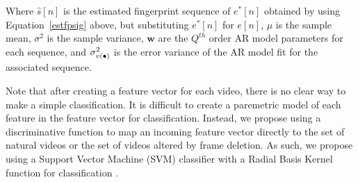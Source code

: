 Where $\hat{s}[n]$ is the estimated fingerprint sequence of $e^{*}[n]$ obtained by using Equation~\ref{estfpsig} above, but substituting $e^{*}[n]$ for $e[n]$, $\mu$ is the sample mean, $\sigma^{2}$ is the sample variance, $\bm{w}$ are the $Q^{th}$ order AR model parameters for each sequence, and $\sigma_{v(\small \bullet)}^{2}$ is the error variance of the AR model fit for the associated sequence.

Note that after creating a feature vector for each video, there is no clear way to make a simple classification. It is difficult to create a paremetric model of each feature in the feature vector for classification. Instead, we propose using a discriminative function to map an incoming feature vector directly to the set of natural videos or the set of videos altered by frame deletion. As such, we propose using a Support Vector Machine (SVM) classifier with a Radial Basis Kernel function for classification \cite{svm}. 